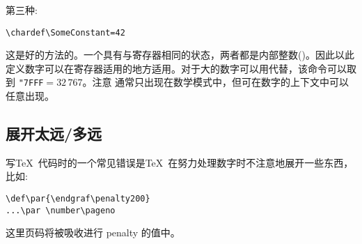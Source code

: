 \documentclass{book}
\begin{document}
第三种:
\begin{verbatim}
\chardef\SomeConstant=42
\end{verbatim}

这是好的方法的。一个具有与寄存器相同的状态，两者都是内部整数()。因此以此定义数字可以在寄存器适用的地方适用。对于大的数字可以用代替，该命令可以取到 \verb>"7FFF>${}=32\,767$。注意
通常只出现在数学模式中，但可在数字的上下文中可以任意出现。


\subsection{展开太远/多远}

写\TeX\ 代码时的一个常见错误是\TeX\ 在努力处理数字时不注意地展开一些东西，比如:

\begin{verbatim}
\def\par{\endgraf\penalty200}
...\par \number\pageno
\end{verbatim}

这里页码将被吸收进行 penalty 的值中。


\end{document}
